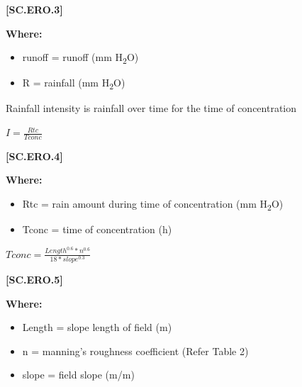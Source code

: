             {\raggedleft \textbf{[SC.ERO.3]}\par}
            \vspace{0.5cm}

        \textbf{Where:}
            
        \begin{itemize}
            \item runoff	=	runoff (mm H\textsubscript{2}O)
            \item 	R	=	rainfall (mm H\textsubscript{2}O)
        \end{itemize}
    \vspace{0.5cm}

Rainfall intensity is rainfall over time for the time of concentration
 \vspace{0.5cm}

    \begin{center}
 \(I=\frac{Rtc}{Tconc}\)
    \end{center}
        \vspace{0.5cm} 
    
            {\raggedleft \textbf{[SC.ERO.4]}\par}
            \vspace{0.5cm}

        \textbf{Where:}
            
        \begin{itemize}
            \item Rtc	=	rain amount during time of concentration (mm H\textsubscript{2}O)
            \item Tconc	=	time of concentration (h)
        \end{itemize}
    \vspace{0.5cm}

    \begin{center}
 \(Tconc=\frac{Length^{0.6} * n^{0.6}}{18 * slope^{0.3}}\)
    \end{center}
        \vspace{0.5cm} 
    
            {\raggedleft \textbf{[SC.ERO.5]}\par}
            \vspace{0.5cm}

        \textbf{Where:}
            
        \begin{itemize}
            \item Length	=	slope length of field (m)
            \item n	=	manning’s roughness coefficient (Refer Table 2)
            \item slope	=	field slope (m/m)
        \end{itemize}
    \vspace{0.5cm}

